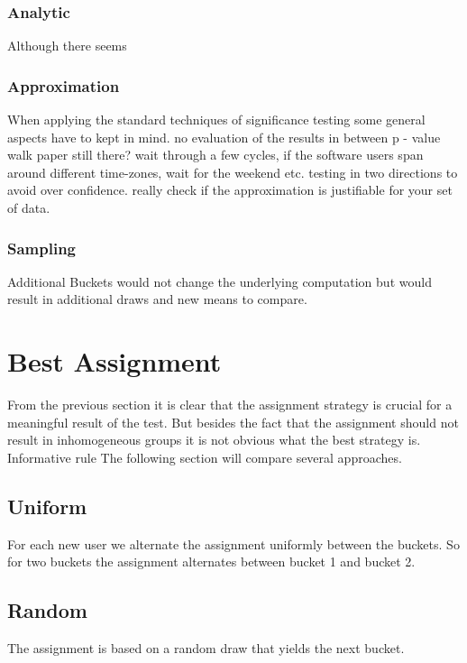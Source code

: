 \documentclass[../Thesis.tex]{subfiles}
\begin{document}
\subsubsection{Analytic}
Although there seems

\subsubsection{Approximation}
When applying the standard techniques of significance testing some general aspects have to kept in mind.
no evaluation of the results in between p - value walk paper still there?
wait through a few cycles, if the software users span around different time-zones, wait for the weekend etc.
testing in two directions to avoid over confidence. really check if the approximation is justifiable for your set of data.
\subsubsection{Sampling}
Additional Buckets would not change the underlying computation but would result in additional draws and new means to compare. 

\section{Best Assignment}
From the previous section it is clear that the assignment strategy is crucial for a meaningful result of the test. But besides the fact that the assignment should not result in inhomogeneous groups it is not obvious what the best strategy is. Informative rule The following section will compare several approaches.
\subsection{Uniform}
For each new user we alternate the assignment uniformly between the buckets. So for two buckets the assignment alternates between bucket 1 and bucket 2.
\subsection{Random}
The assignment is based on a random draw that yields the next bucket.
\end{document}
